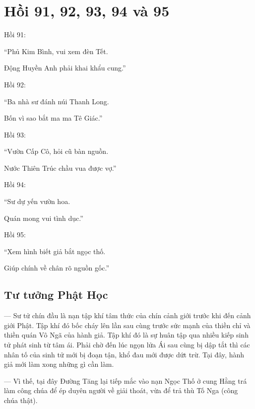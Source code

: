 \chapter{Hồi 91, 92, 93, 94 và 95} %
\label{cha:hoi_91_92_95}

Hồi 91:

\begin{itshape}
``Phủ Kim Bình, vui xem đèn Tết.

Động Huyền Anh phải khai khẩu cung.''
\end{itshape}

Hồi 92:

\begin{itshape}
``Ba nhà sư đánh núi Thanh Long.

Bốn vì sao bắt ma ma Tê Giác.''
\end{itshape}

Hồi 93:

\begin{itshape}
``Vườn Cấp Cô, hỏi cũ bàn nguồn.

Nước Thiên Trúc chầu vua được vợ.''
\end{itshape}

Hồi 94:

\begin{itshape}
``Sư dự yến vườn hoa.

Quán mong vui tình dục.''
\end{itshape}

Hồi 95:

\begin{itshape}
``Xem hình biết giả bắt ngọc thố.

Giúp chính về chân rõ nguồn gốc.''
\end{itshape}

\section{Tư tưởng Phật Học} %
\label{sec:91_92_95_phat_hoc}

— Sư tử chín đầu là nạn tập khí tâm thức của chín cảnh giới trước khi đến cảnh giới Phật. Tập khí đó bốc cháy lên lần sau cùng trước sức mạnh của thiền chỉ và thiền quán Vô Ngã của hành giả. Tập khí đó là sự huân tập qua nhiều kiếp sinh tử phát sinh từ tâm ái. Phải chờ đến lúc ngọn lửa Ái sau cùng bị dập tắt thì các nhân tố của sinh tử mới bị đoạn tận, khổ đau mới được dứt trừ. Tại đây, hành giả mới làm xong những gì cần làm.

— Vì thế, tại đây Đường Tăng lại tiếp mắc vào nạn Ngọc Thố ở cung Hằng trá làm công chúa để ép duyên người về giải thoát, vừa để trả thù Tố Nga (công chúa thật).

